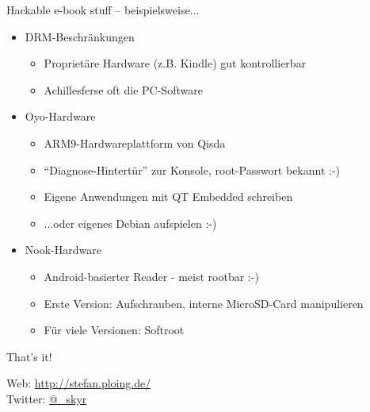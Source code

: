\documentclass[hyperref={pdfpagelabels=false}]{beamer}
\begin{document}
\begin{frame}{Hackable e-book stuff -- beispielsweise...}
	\begin{itemize}
		\item DRM-Beschränkungen
		\begin{itemize}
			\item Proprietäre Hardware (z.B. Kindle) gut kontrollierbar
			\item Achillesferse oft die PC-Software
		\end{itemize}
		\item Oyo-Hardware
		\begin{itemize}
			\item ARM9-Hardwareplattform von Qisda
			\item "`Diagnose-Hintertür"' zur Konsole, root-Passwort bekannt :-)
			\item Eigene Anwendungen mit QT Embedded schreiben
			\item ...oder eigenes Debian aufspielen :-)
		\end{itemize}
		\item Nook-Hardware
		\begin{itemize}
			\item Android-basierter Reader - meist rootbar :-)
			\item Erste Version: Aufschrauben, interne MicroSD-Card manipulieren
			\item Für viele Versionen: Softroot
		\end{itemize}
	\end{itemize}
\end{frame}


\begin{frame}[plain]
	That's it!
	\begin{center}
	\end{center}
	\begin{center}
		Web: \url{http://stefan.ploing.de/} \\
		Twitter: \href{https://twitter.com/\_skyr}{@\_skyr}
	\end{center}
\end{frame}


\end{document}
